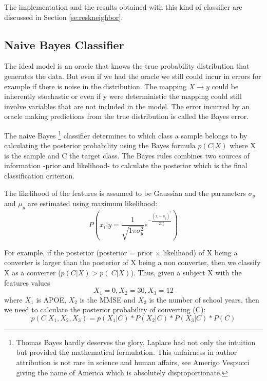 \documentclass[11pt]{article}
\begin{document}
The implementation and the results obtained with this kind of classifier are discussed in Section \ref{se:reskneighbor}.

\subsection{Naive Bayes Classifier}
\label{sse:naivebayes}
The ideal model is an oracle that knows the true probability distribution that generates the data. But even if we had the oracle we still could incur in errors for example if there is noise in the distribution.
The mapping $X \to y$ could be inherently stochastic or even if y were deterministic the mapping could still involve variables that are not included in the model. The error incurred by an oracle making predictions from the true distribution is called the Bayes error.

The naive Bayes \footnote{Thomas Bayes hardly deserves the glory, Laplace had not only the intuition but provided the mathematical formulation. This unfairness in author attribution is not rare in science and human affairs, see Amerigo Vespucci giving the name of America which is absolutely disproportionate.} classifier determines to which class a sample belongs to by calculating the posterior probability using the Bayes formula $p(C|X)$ where X is the sample and C the target class.
The Bayes rules combines two sources of information -prior and likelihood- to calculate the posterior which is the final classification criterion. 

The likelihood of the features is assumed to be Gaussian and the parameters $\sigma_y$ and $\mu_y$ are estimated using maximum likelihood:
\begin{equation} \label{eq:naiveb}
P(x_i|y= \frac{1}{\sqrt{1\pi\sigma_y^{2}}}e^{-\frac{(x_i-\mu_y)^2}{2\sigma_y^2}})
\end{equation}


For example, if the posterior (posterior = prior $\times$ likelihood) of X being a converter is larger than the posterior of X being a non converter, then we classify X as a converter ($p(C|X) > p(~C|X)$). Thus, given a subject X with the features values 
\begin{equation*}
X_1 = 0, X_2=30, X_3=12
\end{equation*}
where $X_1$ is APOE, $X_2$ is the MMSE and $X_3$ is the number of school years, then we need to calculate the 
posterior probability of converting (C):
\begin{equation*}
p(C|X_1,X_2,X_3) = p(X_1|C) * P(X_2|C) * P(X_3|C) * P(C)
\end{equation*}
\end{document}
